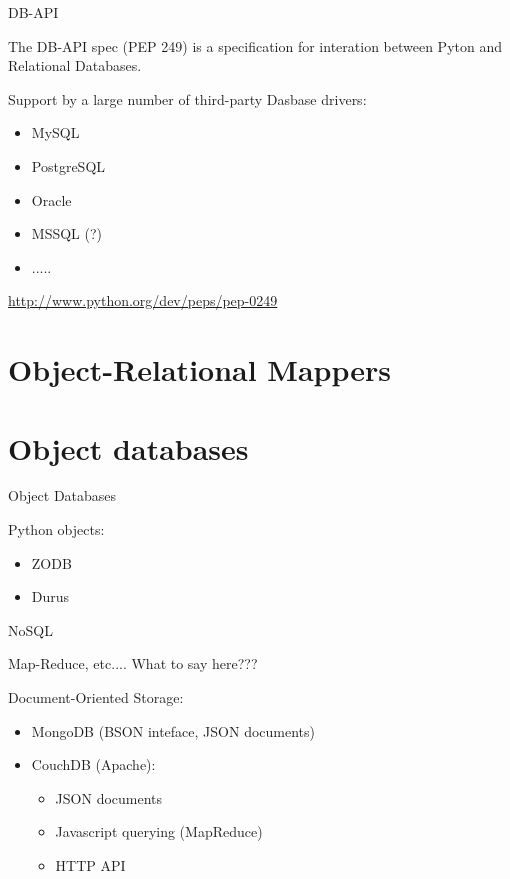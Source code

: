 \documentclass{beamer}
\begin{document}
\begin{frame}[fragile]{DB-API}

\vfill
{\Large The DB-API spec (PEP 249) is a specification for interation between Pyton and Relational Databases.}

\vfill
{\Large Support by a large number of third-party Dasbase drivers:
\begin{itemize}
  \item MySQL
  \item PostgreSQL
  \item Oracle
  \item MSSQL (?)
  \item .....
\end{itemize}
}
\vfill
\url{http://www.python.org/dev/peps/pep-0249}
\end{frame} 


\section{Object-Relational Mappers}

\section{Object databases}

\begin{frame}[fragile]{Object Databases}

Python objects:
\begin{itemize}
  \item ZODB
  \item Durus
\end{itemize}

\end{frame} 

\begin{frame}[fragile]{NoSQL}

Map-Reduce, etc....
What to say here???

Document-Oriented Storage: 
\begin{itemize}
  \item MongoDB (BSON inteface, JSON documents)
  \item CouchDB (Apache):
  \begin{itemize}
    \item  JSON documents
    \item  Javascript querying (MapReduce)  
    \item  HTTP API  
  \end{itemize}
\end{itemize}

\end{frame} 
\end{document}
